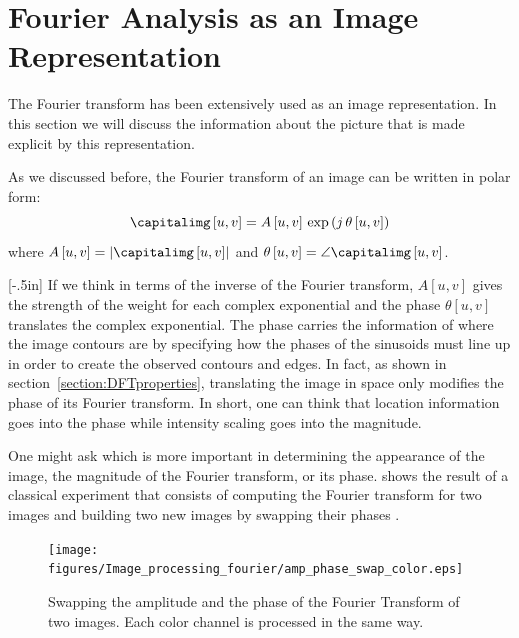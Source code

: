 \section{Fourier Analysis as an Image Representation}

The Fourier transform has been extensively used as an image representation. In this section we will discuss the information about the picture that is made explicit by this representation.


As we discussed before, the Fourier transform of an image can be written in polar form:
\begin{equation}
\capitalimg \left[u,v \right]  = A \left[u,v \right] \, \exp{\left( j\, \theta\left[u,v \right]  \right)}
\end{equation}
where $A \left[u,v \right] = \left| \capitalimg \left[u,v \right]  \right|$ and $\theta \left[u,v \right] = \angle  \capitalimg \left[u,v \right]$.

 
[-.5in]
If we think in terms of the inverse of the Fourier transform, $A \left[u,v \right]$ gives the strength of the weight for each complex exponential and the phase $\theta \left[u,v \right]$ translates the complex exponential. The phase carries the information of where the image
contours are by specifying how the phases of the sinusoids must line up in order to create the observed contours and edges. In fact, as shown in section~\ref{section:DFTproperties}, translating the image in space only modifies the phase of its Fourier transform. In short, one can think that location information goes into the phase while intensity scaling goes into the magnitude. 

One might ask which is more important in determining the appearance of the image, the magnitude
of the Fourier transform, or its phase.  \Fig{\ref{fig:phaseoramp}} shows the result of a classical experiment that consists of computing the Fourier transform for two images and building two new images by swapping their phases \cite{Oppenheim1981}. 


\begin{figure}
\centerline{
\texttt{[image: figures/Image\_processing\_fourier/amp\_phase\_swap\_color.eps]}}
\caption{Swapping the amplitude and the phase of the Fourier Transform of two images. Each color channel is processed in the same way.}
\label{fig:phaseoramp}
\end{figure}

